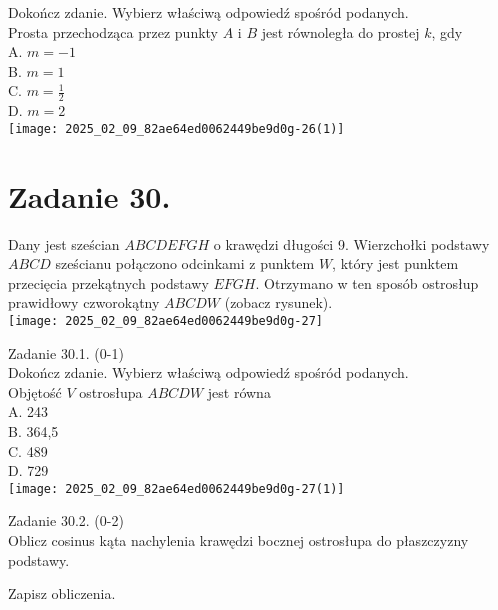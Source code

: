 \documentclass[10pt]{article}
\begin{document}
Dokończ zdanie. Wybierz właściwą odpowiedź spośród podanych.\\
Prosta przechodząca przez punkty \(A\) i \(B\) jest równoległa do prostej \(k\), gdy\\
A. \(m=-1\)\\
B. \(m=1\)\\
C. \(m=\frac{1}{2}\)\\
D. \(m=2\)\\
\texttt{[image: 2025\_02\_09\_82ae64ed0062449be9d0g-26(1)]}

\section*{Zadanie 30.}
Dany jest sześcian \(A B C D E F G H\) o krawędzi długości 9. Wierzchołki podstawy \(A B C D\) sześcianu połączono odcinkami z punktem \(W\), który jest punktem przecięcia przekątnych podstawy \(E F G H\). Otrzymano w ten sposób ostrosłup prawidłowy czworokątny \(A B C D W\) (zobacz rysunek).\\
\texttt{[image: 2025\_02\_09\_82ae64ed0062449be9d0g-27]}

Zadanie 30.1. (0-1)\\
Dokończ zdanie. Wybierz właściwą odpowiedź spośród podanych.\\
Objętość \(V\) ostrosłupa \(A B C D W\) jest równa\\
A. 243\\
B. 364,5\\
C. 489\\
D. 729\\
\texttt{[image: 2025\_02\_09\_82ae64ed0062449be9d0g-27(1)]}

Zadanie 30.2. (0-2)\\
Oblicz cosinus kąta nachylenia krawędzi bocznej ostrosłupa do płaszczyzny podstawy.

Zapisz obliczenia.
\end{document}
